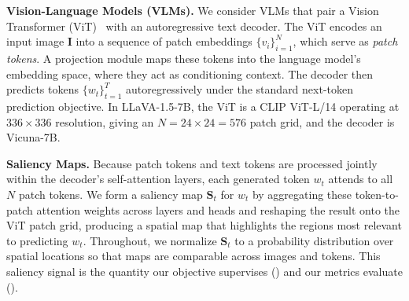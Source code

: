 \textbf{Vision-Language Models (VLMs).} We consider VLMs that pair a Vision Transformer (ViT)~\citep{dosovitskiy2020vit} with an autoregressive text decoder. The ViT encodes an input image $\mathbf{I}$ into a sequence of patch embeddings $\{v_i\}_{i=1}^{N}$, which serve as \emph{patch tokens}. A projection module maps these tokens into the language model's embedding space, where they act as conditioning context. The decoder then predicts tokens $\{w_t\}_{t=1}^{T}$ autoregressively under the standard next-token prediction objective. In LLaVA-1.5-7B, the ViT is a CLIP ViT-L/14 operating at $336{\times}336$ resolution, giving an $N = 24{\times}24 = 576$ patch grid, and the decoder is Vicuna-7B.

\textbf{Saliency Maps.} Because patch tokens and text tokens are processed jointly within the decoder's self-attention layers, each generated token $w_t$ attends to all $N$ patch tokens. We form a saliency map $\mathbf{S}_t$ for $w_t$ by aggregating these token-to-patch attention weights across layers and heads and reshaping the result onto the ViT patch grid, producing a spatial map that highlights the regions most relevant to predicting $w_t$. Throughout, we normalize $\mathbf{S}_t$ to a probability distribution over spatial locations so that maps are comparable across images and tokens. This saliency signal is the quantity our objective supervises () and our metrics evaluate ().

